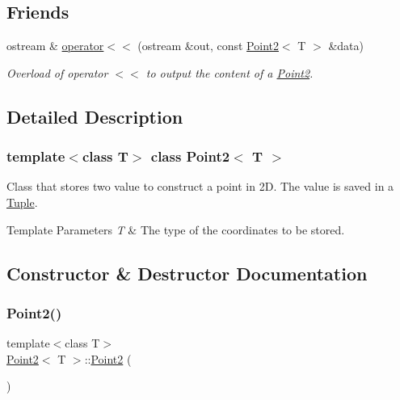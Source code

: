 \subsection*{Friends}
\begin{DoxyCompactItemize}
\item 
ostream \& \mbox{\hyperlink{class_point2_a9156326af6248209210a7bd67569e5c2}{operator$<$$<$}} (ostream \&out, const \mbox{\hyperlink{class_point2}{Point2}}$<$ T $>$ \&data)
\begin{DoxyCompactList}\small\item\em Overload of operator $<$$<$ to output the content of a {\ttfamily \mbox{\hyperlink{class_point2}{Point2}}}. \end{DoxyCompactList}\end{DoxyCompactItemize}


\subsection{Detailed Description}
\subsubsection*{template$<$class T$>$\newline
class Point2$<$ T $>$}

Class that stores two value to construct a point in 2D. The value is saved in a \mbox{\hyperlink{class_tuple}{Tuple}}. 


\begin{DoxyTemplParams}{Template Parameters}
{\em T} & The type of the coordinates to be stored. \\
\hline
\end{DoxyTemplParams}


\subsection{Constructor \& Destructor Documentation}
\mbox{\label{class_point2_a4674f9e2fab693fc83afd5af234100d3}} 
\subsubsection{\texorpdfstring{Point2()}{Point2()}\hspace{0.1cm}{\footnotesize\ttfamily [1/3]}}
{\footnotesize\ttfamily template$<$class T$>$ \\
\mbox{\hyperlink{class_point2}{Point2}}$<$ T $>$\+::\mbox{\hyperlink{class_point2}{Point2}} (\begin{DoxyParamCaption}{ }\end{DoxyParamCaption})\hspace{0.3cm}{\ttfamily [inline]}}



